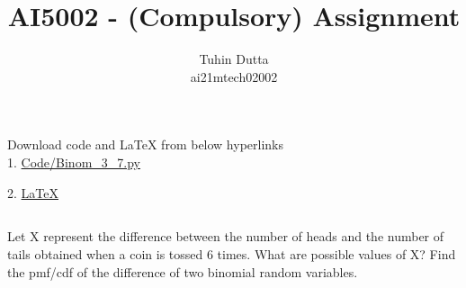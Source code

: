 \documentclass[journal,12pt,twocolumn]{IEEEtran}
\begin{document}
\providecommand{\mtx}[1]{\mathbf{#1}}
\providecommand{\fourier}{\overset{\mathcal{F}}{ \rightleftharpoons}}
\providecommand{\system}{\overset{\mathcal{H}}{ \longleftrightarrow}}
\newcommand{\solution}{\noindent \textbf{Solution: }}
\newcommand{\cosec}{\,\text{cosec}\,}
\providecommand{\dec}[2]{\ensuremath{\overset{#1}{\underset{#2}{\gtrless}}}}
\newcommand{\myvec}[1]{\ensuremath{\begin{pmatrix}#1\end{pmatrix}}}
\newcommand{\mydet}[1]{\ensuremath{\begin{vmatrix}#1\end{vmatrix}}}
\makeatletter
{}
\makeatother
\let\StandardTheFigure\thefigure
\let\vec\mathbf
\renewcommand{\thefigure}{\theproblem}
\def\putbox#1#2#3{\makebox[0in][l]{\makebox[#1][l]{}\raisebox{\baselineskip}[0in][0in]{\raisebox{#2}[0in][0in]{#3}}}}
     \def\rightbox#1{\makebox[0in][r]{#1}}
     \def\centbox#1{\makebox[0in]{#1}}
     \def\topbox#1{\raisebox{-\baselineskip}[0in][0in]{#1}}
     \def\midbox#1{\raisebox{-0.5\baselineskip}[0in][0in]{#1}}
\vspace{3cm}
\title{AI5002 - (Compulsory) Assignment}
\author{Tuhin Dutta\\ ai21mtech02002}
\maketitle
\newpage
\bigskip
\renewcommand{\thefigure}{\theenumi}
\renewcommand{\thetable}{\theenumi}
\begin{mdframed}
Download code and LaTeX from below hyperlinks\\
1. \href{https://github.com/Tauhait/AI5002/blob/main/Compulsory-Assignment/Code/Binom\_3\_7.py}{Code/Binom\_3\_7.py}


2. \href{https://github.com/Tauhait/AI5002/tree/main/Compulsory-Assignment/LaTeX}{LaTeX}
\end{mdframed}
\subsection*{}
Let X represent the difference between the number of heads and the number of tails
obtained when a coin is tossed 6 times. What are possible values of X?
Find the pmf/cdf of the difference of two binomial random variables.
\end{document}
